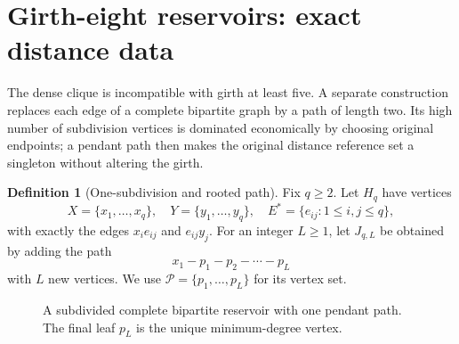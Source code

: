 \documentclass[11pt,a4paper]{article}
\theoremstyle{definition}
\newtheorem{definition}[theorem]{Definition}
\theoremstyle{remark}
\begin{document}
\section{Girth-eight reservoirs: exact distance data}
The dense clique is incompatible with girth at least five. A separate construction replaces each edge of a complete bipartite graph by a path of length two. Its high number of subdivision vertices is dominated economically by choosing original endpoints; a pendant path then makes the original distance reference set a singleton without altering the girth.

\begin{definition}[One-subdivision and rooted path]\label{def:J}
Fix $q\ge2$. Let $H_q$ have vertices
\[
X=\{x_1,\ldots,x_q\},\quad Y=\{y_1,\ldots,y_q\},\quad E^*=\{e_{ij}:1\le i,j\le q\},
\]
with exactly the edges $x_i e_{ij}$ and $e_{ij}y_j$. For an integer $L\ge1$, let $J_{q,L}$ be obtained by adding the path
\[
 x_1-p_1-p_2-\cdots-p_L
\]
with $L$ new vertices. We use $\mathcal P=\{p_1,\ldots,p_L\}$ for its vertex set.
\end{definition}
\begin{figure}[H]
\centering
{}
\caption{A subdivided complete bipartite reservoir with one pendant path. The final leaf $p_L$ is the unique minimum-degree vertex.}
\label{fig:J}
\end{figure}
\end{document}
